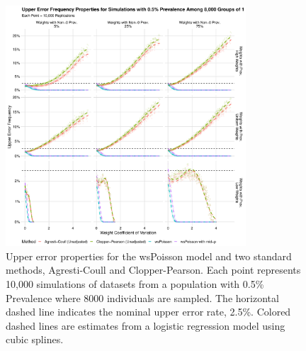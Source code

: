 \documentclass[AMA,STIX1COL]{WileyNJD-v2}
\begin{document}
\begin{figure}
\centering
\includegraphics[width=0.8\textwidth]{figures/perfect_upper_error_frequency_8000_groups_0_005_prev.pdf}
\caption{Upper error properties for the wsPoisson model and two standard methods, Agresti-Coull and Clopper-Pearson.
Each point represents 10,000 simulations of datasets from a population with 0.5\% Prevalence where 8000 individuals are sampled.
The horizontal dashed line indicates the nominal upper error rate, 2.5\%.
Colored dashed lines are estimates from a logistic regression model using cubic splines.}
\label{fig:perfect_upper_error_frequency_8000_groups_0_005_prev}
\end{figure}
\end{document}
